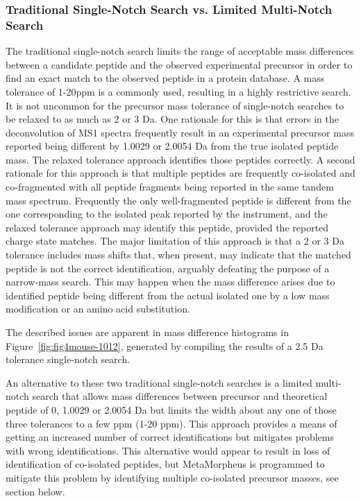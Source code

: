 \documentclass[journal=jprobs,manuscript=article]{achemso}
\begin{document}
\subsubsection{Traditional Single-Notch Search vs. Limited Multi-Notch Search}

The traditional single-notch search limits the range of acceptable mass differences between a candidate peptide and the observed experimental precursor in order to find an exact match to the observed peptide in a protein database.
A mass tolerance of 1-20ppm is a commonly used, resulting in a highly restrictive search.
It is not uncommon for the precursor mass tolerance of single-notch searches to be relaxed to as much as 2 or 3 Da.
One rationale for this is that errors in the deconvolution of MS1 spectra frequently result in an experimental precursor mass reported being different by 1.0029 or 2.0054 Da from the true isolated peptide mass.
The relaxed tolerance approach identifies those peptides correctly.
A second rationale for this approach is that multiple peptides are frequently co-isolated and co-fragmented with all peptide fragments being reported in the same tandem mass spectrum.
Frequently the only well-fragmented peptide is different from the one corresponding to the isolated peak reported by the instrument, and the relaxed tolerance approach may identify this peptide, provided the reported charge state matches.
The major limitation of this approach is that a 2 or 3 Da tolerance includes mass shifts that, when present, may indicate that the matched peptide is not the correct identification, arguably defeating the purpose of a narrow-mass search.
This may happen when the mass difference arises due to identified peptide being different from the actual isolated one by a low mass modification or an amino acid substitution.

The described issues are apparent in mass difference histograms in Figure~\ref{fig:fig4mouse-1012}, generated by compiling the results of a 2.5 Da tolerance single-notch search.

An alternative to these two traditional single-notch searches is a limited multi-notch search that allows mass differences between precursor and theoretical peptide of 0, 1.0029 or 2.0054 Da but limits the width about any one of those three tolerances to a few ppm (1-20 ppm).
This approach provides a means of getting an increased number of correct identifications but mitigates problems with wrong identifications.
This alternative would appear to result in loss of identification of co-isolated peptides, but MetaMorpheus is programmed to mitigate this problem by identifying multiple co-isolated precursor masses, see section below.
\end{document}

